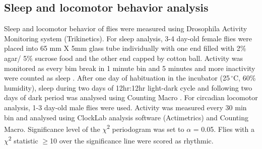 \subsection*{Sleep and locomotor behavior analysis}

Sleep and locomotor behavior of flies were measured using Drosophila Activity Monitoring system (Trikinetics).
For sleep analysis, 3-4 day-old female flies were placed into 65 mm X 5mm glass tube individually with one end filled with 2\% agar/ 5\% sucrose food and the other end capped by cotton ball.
Activity was monitored as every bim break in 1 minute bin and 5 minutes and more inactivity were counted as sleep \cite{10710313}.
After one day of habituation in the incubator (25$\,^{\circ}\mathrm{C}$, 60\% humidity), sleep during two days of 12hr:12hr light-dark cycle and following two days of dark period was analysed using Counting Macro \cite{21041393}.
For circadian locomotor analysis, 1-3 day-old male flies were used. Activity was measured every 30 min bin and analysed using ClockLab analysis software (Actimetrics) and Counting Macro\cite{21041392}. Significance level of the $\chi$\textsuperscript{2} periodogram was set to $\alpha$ = 0.05.
Flies with a $\chi$\textsuperscript{2} statistic $\geq$10 over the significance line were scored as rhythmic.
  
  
  
  
  
  
  
  
  